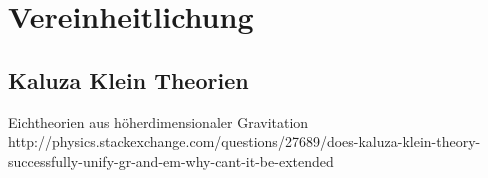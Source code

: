 \chapter{Vereinheitlichung}
\section{Kaluza Klein Theorien}
Eichtheorien aus höherdimensionaler Gravitation
http://physics.stackexchange.com/questions/27689/does-kaluza-klein-theory-successfully-unify-gr-and-em-why-cant-it-be-extended